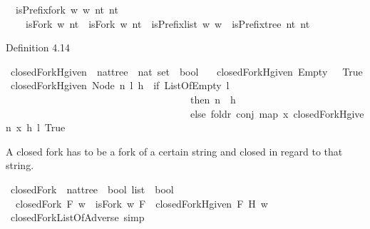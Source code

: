 \begin{isabellebody}
\ \ {\isachardoublequoteopen}isPrefix{\isacharunderscore}fork\ w{}\ w{}\ nt{}\ nt{}\ {\isacharequal}\ \isanewline
\ \ \ \ {\isacharparenleft}isFork\ w{}\ nt{}\ {\isasymand}\ isFork\ w{}\ nt{}\ {\isasymand}\ isPrefix{\isacharunderscore}list\ w{}\ w{}\ {\isasymand}\ isPrefix{\isacharunderscore}tree\ nt{}\ nt{}{\isacharparenright}{\isachardoublequoteclose}%
\begin{isamarkuptext}%
Definition 4.14%
\end{isamarkuptext}\isamarkuptrue%
\isamarkupfalse%
\ closedFork{\isacharunderscore}Hgiven\ {\isacharcolon}{\isacharcolon}\ {\isachardoublequoteopen}nattree\ {\isasymRightarrow}\ nat\ set\ {\isasymRightarrow}\ bool{\isachardoublequoteclose}\ \isanewline
\ \ {\isachardoublequoteopen}closedFork{\isacharunderscore}Hgiven\ Empty\ {\isacharunderscore}\ {\isacharequal}\ True{\isachardoublequoteclose}\isanewline
{\isacharbar}\ {\isachardoublequoteopen}closedFork{\isacharunderscore}Hgiven\ {\isacharparenleft}Node\ n\ l{\isacharparenright}\ h\ {\isacharequal}\ {\isacharparenleft}if\ ListOfEmpty\ l\ \isanewline
\ \ \ \ \ \ \ \ \ \ \ \ \ \ \ \ \ \ \ \ \ \ \ \ \ \ \ \ \ \ \ \ \ \ \ \ \ then\ {\isacharparenleft}n\ {\isasymin}\ h{\isacharparenright}\ \isanewline
\ \ \ \ \ \ \ \ \ \ \ \ \ \ \ \ \ \ \ \ \ \ \ \ \ \ \ \ \ \ \ \ \ \ \ \ \ else\ foldr\ conj\ {\isacharparenleft}map\ {\isacharparenleft}{\isasymlambda}x{\isachardot}\ closedFork{\isacharunderscore}Hgiven\ x\ h{\isacharparenright}\ l{\isacharparenright}\ True{\isacharparenright}{\isachardoublequoteclose}%
\begin{isamarkuptext}%
A closed fork has to be a fork of a certain string and closed in regard to that string.%
\end{isamarkuptext}\isamarkuptrue%
\isamarkupfalse%
\ closedFork\ {\isacharcolon}{\isacharcolon}\ {\isachardoublequoteopen}nattree\ {\isasymRightarrow}\ bool\ list\ {\isasymRightarrow}\ bool{\isachardoublequoteclose}\ \isanewline
\ \ {\isachardoublequoteopen}closedFork\ F\ w\ {\isacharequal}\ {\isacharparenleft}isFork\ w\ F\ {\isasymand}\ closedFork{\isacharunderscore}Hgiven\ F\ {\isacharparenleft}H\ w{\isacharparenright}{\isacharparenright}{\isachardoublequoteclose}\isanewline
\isanewline
{}\isamarkupfalse%
\ closedFork{\isacharunderscore}ListOfAdverse\ {\isacharbrackleft}simp{\isacharbrackright}{\isacharcolon}\ \isanewline

\end{isabellebody}
